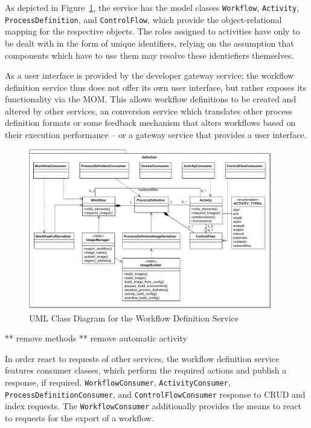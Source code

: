     As depicted in Figure~\ref{fig:uml_class_diagram_for_the_definition_service},
    the service has the model classes \texttt{Workflow}, \texttt{Activity}, \texttt{ProcessDefinition}, and \texttt{ControlFlow}, which provide the object-relational mapping for the respective objects. The roles assigned to activities have only to be dealt with in the form of unique identifiers, relying on the assumption that components which have to use them may resolve these identiefiers themselves.

    As a user interface is provided by the developer gateway service; the workflow definition service thus does not offer its own user interface, but rather exposes its functionality via the \ac{MOM}. This allows workflow definitions to be created and altered by other services, \eg an conversion service which translates other process definition formats or some feedback mechanism that alters workflows based on their execution performance -- or a gateway service that provides a user interface.

    \begin{figure}[htbp]
      \centering
      \includegraphics[width=0.95\textwidth]{content/images/class_diagram_definition-crop.pdf}
      \caption{UML Class Diagram for the Workflow Definition Service}
      \label{fig:uml_class_diagram_for_the_definition_service}
    \end{figure}

    ** remove methods
    ** remove automatic activity

    In order react to requests of other services, the workflow definition service features consumer classes, which perform the required actions and publish a response, if required. \texttt{WorkflowConsumer}, \texttt{ActivityConsumer}, \texttt{ProcessDefinitionConsumer}, and \texttt{ControlFlowConsumer} response to \ac{CRUD} and index requests. The \texttt{WorkflowConsumer} additionally provides the means to react to requests for the export of a workflow.

